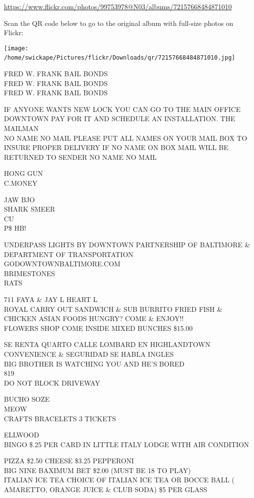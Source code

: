 \documentclass[10pt,letterpaper]{article}
\begin{document}
\url{https://www.flickr.com/photos/99753978@N03/albums/72157668484871010}

Scan the QR code below to go to the original album with full-size photos on Flickr:

\texttt{[image: /home/swickape/Pictures/flickr/Downloads/qr/72157668484871010.jpg]}
\

FRED W. FRANK BAIL BONDS\\
FRED W. FRANK BAIL BONDS\\
FRED W. FRANK BAIL BONDS

IF ANYONE WANTS NEW LOCK YOU CAN GO TO THE MAIN OFFICE DOWNTOWN PAY FOR IT AND SCHEDULE AN INSTALLATION. THE MAILMAN\\
NO NAME NO MAIL PLEASE PUT ALL NAMES ON YOUR MAIL BOX TO INSURE PROPER DELIVERY IF NO NAME ON BOX MAIL WILL BE RETURNED TO SENDER NO NAME NO MAIL

HONG GUN\\
C.MONEY

JAW BJO\\
SHARK SMEER\\
CU\\
P\$ HB!

UNDERPASS LIGHTS BY DOWNTOWN PARTNERSHIP OF BALTIMORE \& DEPARTMENT OF TRANSPORTATION GODOWNTOWNBALTIMORE.COM\\
BRIMESTONES\\
RATS

711 FAYA \& JAY L HEART L\\
ROYAL CARRY OUT SANDWICH \& SUB BURRITO FRIED FISH \& CHICKEN ASIAN FOODS HUNGRY?  COME \& ENJOY!!\\
FLOWERS SHOP COME INSIDE MIXED BUNCHES \$15.00

SE RENTA QUARTO CALLE LOMBARD EN HIGHLANDTOWN CONVENIENCE \& SEGURIDAD SE HABLA INGLES\\
BIG BROTHER IS WATCHING YOU AND HE'S BORED\\
819\\
DO NOT BLOCK DRIVEWAY

BUCHO SOZE\\
MEOW\\
CRAFTS BRACELETS 3 TICKETS

ELLWOOD\\
BINGO \$.25 PER CARD IN LITTLE ITALY LODGE WITH AIR CONDITION

PIZZA \$2.50 CHEESE \$3.25 PEPPERONI\\
BIG NINE BAXIMUM BET \$2.00 (MUST BE 18 TO PLAY)\\
ITALIAN ICE TEA CHOICE OF ITALIAN ICE TEA OR BOCCE BALL ( AMARETTO, ORANGE JUICE \& CLUB SODA) \$5 PER GLASS
\end{document}

